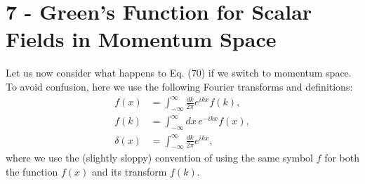 \documentclass[working, oneside]{../../Preambles/tuftebook}
\begin{document}
\let\cleardoublepage\clearpage
\thispagestyle{fancy}
\chapter{7 - Green's Function for Scalar Fields in Momentum Space}

Let us now consider what happens to Eq. (70) if we switch to momentum space.  
To avoid confusion, here we use the following Fourier transforms and definitions:
\begin{align*}
f(x) &= \int_{-\infty}^\infty \frac{dk}{2\pi} e^{ikx} f(k), \\
f(k) &= \int_{-\infty}^\infty dx \, e^{-ikx} f(x), \\
\delta(x) &= \int_{-\infty}^\infty \frac{dk}{2\pi} e^{ikx},
\end{align*}
where we use the (slightly sloppy) convention of using the same symbol $f$ for both the function $f(x)$ and its transform $f(k)$.
\end{document}
